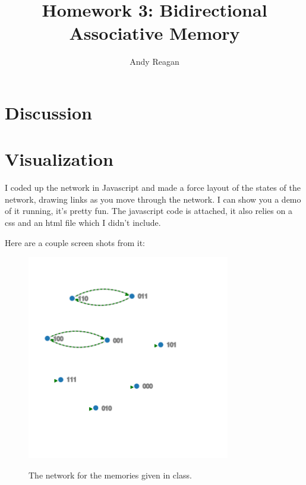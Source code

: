 \documentclass{article}
\begin{document}
\title{\vspace{-2cm}Homework 3: Bidirectional Associative Memory}
\author{Andy Reagan}

\maketitle

\section{Discussion}


\section{Visualization}

I coded up the network in Javascript and made a force layout of the states of the network, drawing links as you move through the network.
I can show you a demo of it running, it's pretty fun.
The javascript code is attached, it also relies on a css and an html file which I didn't include.

Here are a couple screen shots from it:

\begin{figure}[h!]
 \centering
  \includegraphics[width=0.79\textwidth]{network1.png}
  \label{fig:1}
  \caption{The network for the memories given in class.}
\end{figure}
\end{document}
